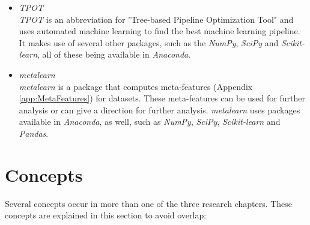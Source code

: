 \documentclass[10pt,a4paper]{report}
\begin{document}
	\begin{itemize}
		\item \textit{TPOT} \cite{olson2016tpot} \\
		\textit{TPOT} is an abbreviation for "Tree-based Pipeline Optimization Tool" and uses automated machine learning to find the best machine learning pipeline. It makes use of several other packages, such as the \textit{NumPy}, \textit{SciPy} and \textit{Scikit-learn}, all of these being available in \textit{Anaconda}.
		\item \textit{metalearn} \\
		\textit{metalearn} is a package that computes meta-features (Appendix \ref{app:MetaFeatures}) for datasets. These meta-features can be used for further analysis or can give a direction for further analysis. \textit{metalearn} uses packages available in \textit{Anaconda}, as well, such as \textit{NumPy}, \textit{SciPy}, \textit{Scikit-learn} and \textit{Pandas}.
	\end{itemize}


	\section{Concepts}
	\label{PLsec:Concepts}
	
	Several concepts occur in more than one of the three research chapters. These concepts are explained in this section to avoid overlap:
	
\end{document}
